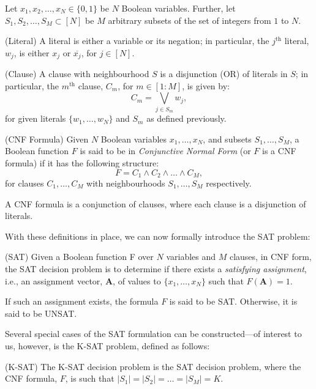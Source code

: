 \documentclass[letterpaper,english,11pt]{article}
\begin{document}
Let $x_1,x_2,\ldots,x_N\in \{0,1\}$ be $N$ Boolean variables. Further, let $S_1,S_2,\ldots,S_M\subset [N]$ be $M$ arbitrary subsets of the set of integers from $1$ to $N$. 
\begin{defn}(Literal)
A literal is either a variable or its negation; in particular, the $j^{\text{th}}$ literal, $w_j$, is either $x_j$ or $\overline{x_j}$, for $j\in [N]$.
\end{defn}
\begin{defn}(Clause)
A clause with neighbourhood $S$ is a disjunction (OR) of literals in $S$; in particular, the $m^{\text{th}}$ clause, $C_m$, for $m\in [1:M]$, is given by:
\begin{equation*}
    C_m = \bigvee_{j\in S_m} w_j,
\end{equation*}
for given literals $\{w_1,\ldots,w_N\}$ and $S_m$ as defined previously. 
\end{defn}
\begin{defn}(CNF Formula)
 Given $N$ Boolean variables $x_1,\ldots,x_N$, and subsets $S_1,\ldots,S_M$, a Boolean function $F$ is said to be in \textit{Conjunctive Normal Form} (or $F$ is a CNF formula) if it has the following structure:
\begin{equation*}
    F=C_1\wedge C_2\wedge \ldots \wedge C_M,
\end{equation*}
for clauses $C_1,\ldots,C_M$ with neighbourhoods $S_1,\ldots,S_M$ respectively.
\end{defn}
\begin{rem}
A CNF formula is a conjunction of clauses, where each clause is a disjunction of literals.
\end{rem}
With these definitions in place, we can now formally introduce the SAT problem:
\begin{defn}(SAT)
Given a Boolean function F over $N$ variables and $M$ clauses, in CNF form, the SAT decision problem is to determine if there exists a \textit{satisfying assignment}, i.e., an assignment vector, ${\mathbf{A}}$, of values to $\{x_1,\ldots,x_N\}$ such that $F({\mathbf{A}}) = 1$.

If such an assignment exists, the formula $F$ is said to be SAT. Otherwise, it is said to be UNSAT.
\end{defn}
Several special cases of the SAT formulation can be constructed---of interest to us, however, is the K-SAT problem, defined as follows:

\begin{defn}(K-SAT)
The K-SAT decision problem is the SAT decision problem, where the CNF formula, $F$, is such that $|S_1|=|S_2|=\ldots=|S_M|=K$.
\end{defn}
\end{document}

